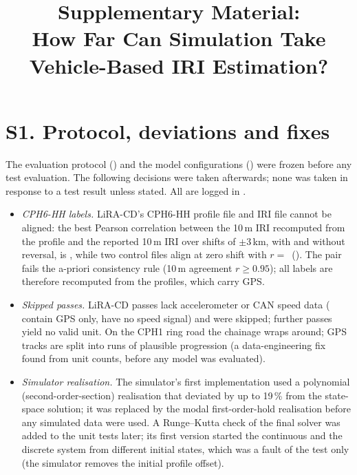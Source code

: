 \documentclass[onecolumn,10pt]{IEEEtran}
\begin{document}
\title{Supplementary Material:\\ How Far Can Simulation Take Vehicle-Based IRI Estimation?}
\maketitle

\section*{S1. Protocol, deviations and fixes}
The evaluation protocol () and the model configurations () were frozen before any test evaluation. The following decisions were taken afterwards; none was taken in response to a test result unless stated. All are logged in .
\begin{itemize}
\item \emph{CPH6-HH labels.} LiRA-CD's CPH6-HH profile file and IRI file cannot be aligned: the best Pearson correlation between the 10\,m IRI recomputed from the profile and the reported 10\,m IRI over shifts of $\pm$3\,km, with and without reversal, is \alignBestR, while two control files align at zero shift with $r=$\,\alignControlR{} (). The pair fails the a-priori consistency rule (10\,m agreement $r\geq0.95$); all labels are therefore recomputed from the profiles, which carry GPS.
\item \emph{Skipped passes.} \liraSkipped{} LiRA-CD passes lack accelerometer or CAN speed data (\liraGpsOnly{} contain GPS only, \liraNoSpeed{} have no speed signal) and were skipped; \liraNoUnits{} further passes yield no valid unit. On the CPH1 ring road the chainage wraps around; GPS tracks are split into runs of plausible progression (a data-engineering fix found from unit counts, before any model was evaluated).
\item \emph{Simulator realisation.} The simulator's first implementation used a polynomial (second-order-section) realisation that deviated by up to 19\,\% from the state-space solution; it was replaced by the modal first-order-hold realisation before any simulated data were used. A Runge--Kutta check of the final solver was added to the unit tests later; its first version started the continuous and the discrete system from different initial states, which was a fault of the test only (the simulator removes the initial profile offset).

\end{itemize}
\end{document}

